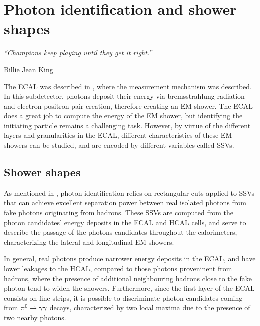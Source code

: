 \chapter{Photon identification and shower shapes}
\label{ch:pid_ss}
\epigraph{\emph{“Champions keep playing until they get it right.”}}{Billie Jean King}


The \ac{ECAL} was described in \Sect{\ref{subsubsec:atlas:atlas:cals:ecal}}, where the measurement mechanism was described. In this subdetector, photons deposit their energy via bremsstrahlung radiation and electron-positron pair creation, therefore creating an \ac{EM} shower. The \ac{ECAL} does a great job to compute the energy of the \ac{EM} shower, but identifying the initiating particle remains a challenging task. 
However, by virtue of the different layers and granularities in the \ac{ECAL}, different characteristics of these \ac{EM} showers can be studied, and are encoded by different variables called \acfp{SSV}.







\section{Shower shapes}
\label{sec:pid_ss:ss}

As mentioned in \Sect{\ref{subsec:objects:egamma:id}}, photon identification relies on rectangular cuts applied to \acp{SSV} that can achieve excellent separation power between real isolated photons from fake photons originating from hadrons. These \acp{SSV} are computed from the photon candidates' energy deposits in the \ac{ECAL} and \ac{HCAL} cells, and serve to describe the passage of the photons candidates throughout the calorimeters, characterizing the lateral and longitudinal \ac{EM} showers.

In general, real photons produce narrower energy deposits in the \ac{ECAL}, and have lower leakages to the \ac{HCAL}, compared to those photons proveninent from hadrons, where the presence of additional neighbouring hadrons close to the fake photon tend to widen the showers. Furthermore, since the first layer of the \ac{ECAL} consists on fine strips, it is possible to discriminate photon candidates coming from \(\pi^{0}\rightarrow\gamma\gamma\) decays, characterized by two local maxima due to the presence of two nearby photons.



